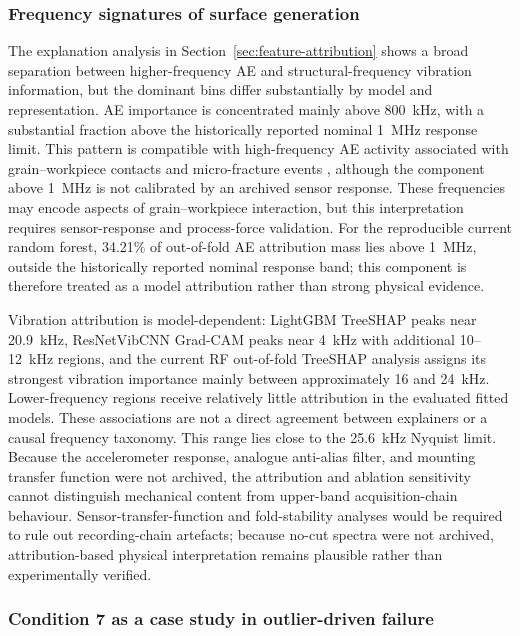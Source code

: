 \subsubsection{Frequency signatures of surface
generation}\label{frequency-signatures}

The explanation analysis in Section~\ref{sec:feature-attribution} shows a
broad separation between higher-frequency AE and structural-frequency
vibration information, but the dominant bins differ substantially by model
and representation. AE importance is concentrated mainly above 800~kHz, with a substantial
fraction above the historically reported nominal 1~MHz response limit. This pattern is
compatible with high-frequency AE activity associated with grain--workpiece
contacts and micro-fracture events \cite{tonshoff1992acoustic}, although
the component above 1~MHz is not calibrated by an archived sensor response.
These frequencies may encode aspects of grain--workpiece interaction, but
this interpretation requires sensor-response and process-force validation.
For the reproducible current random forest, 34.21\% of out-of-fold AE attribution mass lies
above 1~MHz, outside the historically reported nominal response band; this
component is therefore treated as a model attribution rather than strong
physical evidence.

Vibration attribution is model-dependent: LightGBM TreeSHAP peaks near
20.9~kHz, ResNetVibCNN Grad-CAM peaks near 4~kHz with additional 10--12~kHz
regions, and the current RF out-of-fold TreeSHAP analysis assigns its
strongest vibration importance mainly between approximately 16 and 24~kHz.
Lower-frequency regions receive relatively little
attribution in the evaluated fitted models. These associations are not a
direct agreement between explainers or a causal frequency taxonomy. This
range lies close to the 25.6~kHz Nyquist limit. Because the accelerometer
response, analogue anti-alias filter, and mounting transfer function were
not archived, the attribution and ablation sensitivity cannot distinguish
mechanical content from upper-band acquisition-chain behaviour.
Sensor-transfer-function and fold-stability analyses would be required to
rule out recording-chain artefacts; because no-cut spectra were not
archived, attribution-based physical interpretation remains plausible rather
than experimentally verified.

\subsubsection{Condition 7 as a case study in outlier-driven
failure}\label{condition-seven-case}

